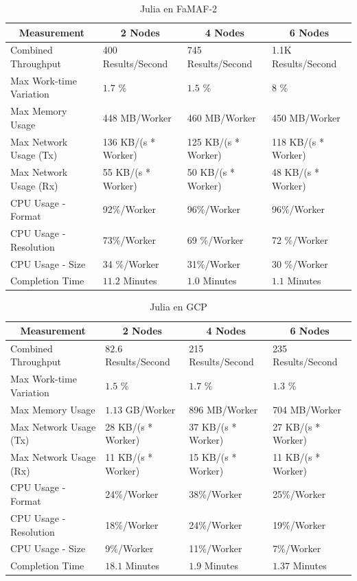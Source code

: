 \documentclass[11pt]{article}
\begin{document}
\begin{table}[H]
\centering
\begin{tabular}{|l|l|l|l|}
\hline
\multicolumn{1}{|c|}{Measurement} & \multicolumn{1}{c|}{2 Nodes} & \multicolumn{1}{c|}{4 Nodes} & \multicolumn{1}{c|}{6 Nodes} \\ \hline
Combined Throughput & 400 Results/Second & 745 Results/Second & 1.1K Results/Second \\ \hline
Max Work-time Variation & $1.7$ \% & $1.5$ \% & 8 \% \\ \hline
Max Memory Usage & 448 MB/Worker & 460 MB/Worker & 450 MB/Worker \\ \hline
Max Network Usage (Tx) & 136 KB/(s * Worker) & 125 KB/(s * Worker) & 118 KB/(s * Worker) \\ \hline
Max Network Usage (Rx) & 55 KB/(s * Worker) & 50 KB/(s * Worker) & 48 KB/(s * Worker) \\ \hline
CPU Usage - Format & 92\%/Worker & 96\%/Worker & 96\%/Worker \\ \hline
CPU Usage - Resolution & 73\%/Worker & 69 \%/Worker & 72 \%/Worker \\ \hline
CPU Usage - Size & 34 \%/Worker & 31\%/Worker & 30 \%/Worker \\ \hline
Completion Time & $11.2$ Minutes & $1.0$ Minutes & $1.1$ Minutes \\ \hline
\end{tabular}
\caption{Julia en FaMAF-2}
\end{table}

\begin{table}[H]
\centering
\begin{tabular}{|l|l|l|l|}
\hline
\multicolumn{1}{|c|}{Measurement} & \multicolumn{1}{c|}{2 Nodes} & \multicolumn{1}{c|}{4 Nodes} & \multicolumn{1}{c|}{6 Nodes} \\ \hline
Combined Throughput & $82.6$ Results/Second & 215 Results/Second & 235 Results/Second \\ \hline
Max Work-time Variation & $1.5$ \% & $1.7$ \% & $1.3$ \% \\ \hline
Max Memory Usage & $1.13$ GB/Worker & 896 MB/Worker & 704 MB/Worker \\ \hline
Max Network Usage (Tx) & 28 KB/(s * Worker) & 37 KB/(s * Worker) & 27 KB/(s * Worker) \\ \hline
Max Network Usage (Rx) & 11 KB/(s * Worker) & 15 KB/(s * Worker) & 11 KB/(s * Worker) \\ \hline
CPU Usage - Format & 24\%/Worker & 38\%/Worker & 25\%/Worker \\ \hline
CPU Usage - Resolution & 18\%/Worker & 24\%/Worker & 19\%/Worker \\ \hline
CPU Usage - Size & 9\%/Worker & 11\%/Worker & 7\%/Worker \\ \hline
Completion Time & $18.1$ Minutes & $1.9$ Minutes & $1.37$ Minutes \\ \hline
\end{tabular}
\caption{Julia en GCP}
\end{table}
\end{document}
